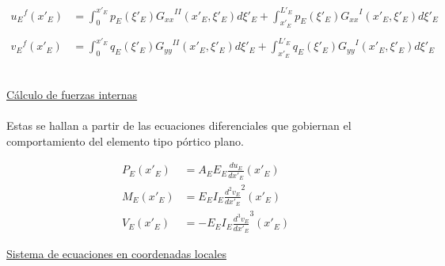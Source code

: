 \documentclass[a4paper]{article}
\begin{document}
\begin{subequation}
\begin{align}
    {u_E}^f(x'_E) & = \int_{0}^{x'_E} p_E({\xi}'_E){G_{xx}}^{II}(x'_E,{\xi}'_E) d{\xi}'_E +
    \int_{x'_E}^{L'_E} p_E({\xi}'_E){G_{xx}}^{I}(x'_E,{\xi}'_E) d{\xi}'_E \\
    \\
    {v_E}^f(x'_E) & = \int_{0}^{x'_E} q_E({\xi}'_E){G_{yy}}^{II}(x'_E,{\xi}'_E) d{\xi}'_E +
    \int_{x'_E}^{L'_E} q_E({\xi}'_E){G_{yy}}^{I}(x'_E,{\xi}'_E) d{\xi}'_E
\end{align}
\end{subequation}
\\
\underline{Cálculo de fuerzas internas}\\
\\
Estas se hallan a partir de las ecuaciones diferenciales que gobiernan el comportamiento del elemento tipo pórtico plano. \\
\begin{subequation}
\begin{align}
    P_E(x'_E) & = A_E E_E \frac{du_E}{dx'_E}(x'_E)\\
    M_E(x'_E) & = E_E I_E \frac{d^2v_E}{dx'_E}^2(x'_E)\\
    V_E(x'_E) & = -E_E I_E \frac{d^3v_E}{dx'_E}^3(x'_E)
\end{align}
\end{subequation}
\underline{Sistema de ecuaciones en coordenadas locales}
\\ \\
\end{document}
